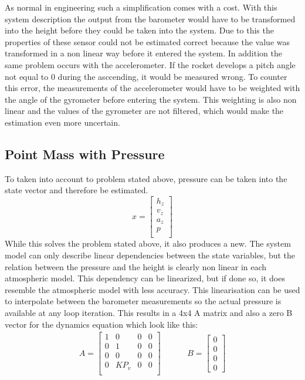   As normal in engineering such a simplification comes with a cost. With this system description the output from the barometer would have
  to be transformed into the height before they could be taken into the system. 
  Due to this the properties of these sensor could not be estimated correct because the value was transformed in a non linear way before it entered the system.
  In addition the same problem occurs with the accelerometer. If the rocket develops a pitch angle not equal to 0 during the asccending, it would be measured wrong.
  To counter this error, the measurements of the accelerometer would have to be weighted with the angle of the gyrometer before entering the system.
  This weighting is also non linear and the values of the gyrometer are not filtered, which would make the estimation even more uncertain.
  
  \subsection{Point Mass with Pressure}
  To taken into account to problem stated above, pressure can be taken into the state vector and therefore be estimated.
  $$ x = \begin{bmatrix}
  h_z\\
  v_z\\
  a_z\\
  p\\
  \end{bmatrix} $$ 
  While this solves the problem stated above, it also produces a new. The system model can only describe linear dependencies between the state variables,
  but the relation between the pressure and the height is clearly non linear in each atmospheric model.
  This dependency can be linearized, but if done so, it does resemble the atmospheric model with less accuracy.
  This linearisation can be used to interpolate between the barometer measurements so the actual pressure is available at any loop iteration.
  This results in a 4x4 A matrix and also a zero B vector for the dynamics equation which look like this:
  \begin{align*}
  A = \begin{bmatrix}
         1    & 0 & 0 & 0    \\
         0    & 1 & 0 & 0    \\
         0    & 0 & 0 & 0    \\
         0    & KP_v & 0 & 0\\
        \end{bmatrix}
        & \hspace{1cm}
    B = \begin{bmatrix}
       0 \\
       0 \\
       0 \\
       0
      \end{bmatrix}
  \end{align*}  
  
